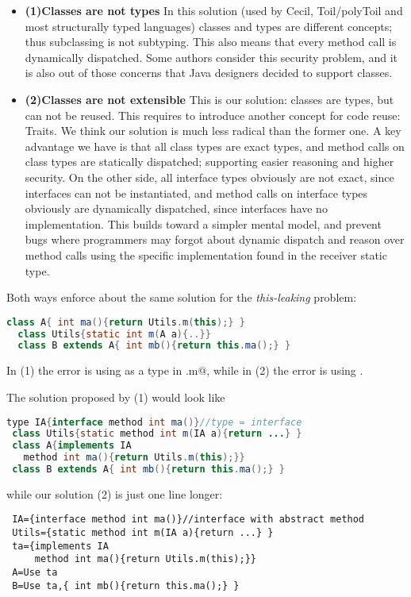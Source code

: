\begin{itemize}
\item \textbf{(1)Classes are not types}
In this solution (used by Cecil, Toil/polyToil and most structurally typed languages) classes and types are different concepts; thus subclassing is not subtyping.
This also means that every method call is dynamically dispatched. Some authors consider this security problem, and it is also out of those concerns that Java designers decided to support \Q@final@ classes.
\item \textbf{(2)Classes are not extensible}
This is our solution: classes are types, but can not be reused. This requires to introduce another concept for code reuse: Traits.
We think our solution is much less radical than the former one.
A key advantage we have is that all class types are exact types, and method calls on class types are statically dispatched; supporting easier reasoning and higher security.
On the other side, all interface types obviously are not exact, since interfaces can not be instantiated,
and method calls on interface types obviously are dynamically dispatched, since interfaces have no implementation.
This builds toward a simpler mental model, and prevent bugs where programmers may forgot about dynamic dispatch and reason over method calls using the specific implementation found in the receiver static type.
\end{itemize}

Both ways enforce about the same solution for the \emph{this-leaking} problem:
\begin{lstlisting}[language=Java]
  class A{ int ma(){return Utils.m(this);} }
  class Utils{static int m(A a){..}}
  class B extends A{ int mb(){return this.ma();} }  
\end{lstlisting}
In (1) the error is using \Q@A@ as a type in \Q@Utils.m@,
while in (2) the error is using \Q@extends@.

The solution proposed by (1) would look like
\begin{lstlisting}[language=Java, morekeywords={type, method}]
 type IA{interface method int ma()}//type = interface
 class Utils{static method int m(IA a){return ...} }
 class A{implements IA 
   method int ma(){return Utils.m(this);}}
 class B extends A{ int mb(){return this.ma();} }  
\end{lstlisting}
while our solution (2) is just one line longer:
\begin{lstlisting}
 IA={interface method int ma()}//interface with abstract method
 Utils={static method int m(IA a){return ...} }
 ta={implements IA
     method int ma(){return Utils.m(this);}}
 A=Use ta
 B=Use ta,{ int mb(){return this.ma();} }  
\end{lstlisting}



